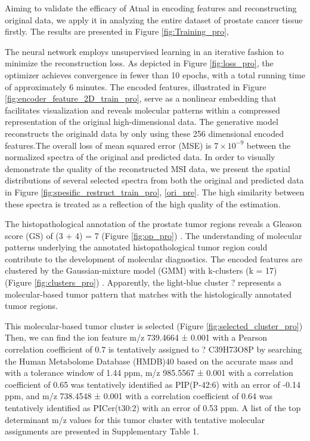 \documentclass[journal=jacsat,manuscript=article]{achemso}
\begin{document}
Aiming to validate the efficacy of Atnal in encoding features and reconstructing 
original data, we apply it in analyzing the entire dataset of prostate cancer tissue firstly. 
The results are presented in Figure \ref{fig:Training_pro},

The neural network employs unsupervised learning in an iterative fashion to 
minimize the reconstruction loss. As depicted in  Figure \ref{fig:loss_pro},
the optimizer achieves convergence in fewer than 
10 epochs, with a total running time of approximately 6 minutes. 
The encoded features, illustrated in  Figure \ref{fig:encoder_feature_2D_train_pro}, 
serve as a nonlinear embedding that facilitates visualization and reveals 
molecular patterns within a compressed  
representation of the original high-dimensional data.
The generative model reconstructs the originald data by only using 
these 256 dimensional encoded features.The overall loss 
of mean squared error (MSE) is $7  \times 10^{-9}$ between 
the normalized spectra of the 
original and predicted data. In order to visually 
demonstrate the quality of the reconstructed MSI data, we present the spatial
distributions of several selected spectra from both the original and 
predicted data in Figure \ref{fig:spesific_restruct_train_pro}, \ref{ori_pre}. 
The high similarity between these spectra is treated  as a 
reflection of the high quality of the estimation. 


The histopathological annotation of the prostate tumor regions reveals 
a Gleason score (GS) of (3 + 4) = 7 (Figure \ref*{fig:op_pro}) \cite{gleason1974prediction}. 
The understanding of molecular patterns underlying 
the annotated histopathological tumor region could contribute to the development 
of molecular diagnostics. The encoded features are clustered by the Gaussian-mixture 
model (GMM) with k-clusters (k = 17) (Figure \ref*{fig:clusters_pro}) .
Apparently, the light-blue cluster ? represents a molecular-based tumor 
pattern that matches with the histologically annotated tumor regions.

This molecular-based tumor cluster is selected (Figure \ref*{fig:selected_cluster_pro}) 
Then, we can find the ion 
feature m/z 739.4664 ± 0.001 with a Pearson correlation coefficient of 0.7 is 
tentatively assigned to ? C39H73O8P by searching the Human Metabolome Database (HMDB)40 
based on the accurate mass and with a tolerance window of 1.44 ppm, m/z 
985.5567 ± 0.001 with a correlation coefficient of 0.65 was tentatively identified 
as PIP(P-42:6) with an error of -0.14 ppm, and m/z 738.4548 ± 0.001 with a correlation 
coefficient of 0.64 was tentatively identified as PICer(t30:2) 
with an error of 0.53 ppm. A list of the top determinant m/z values for this tumor 
cluster with tentative molecular 
assignments are presented in Supplementary Table 1.
\end{document}
